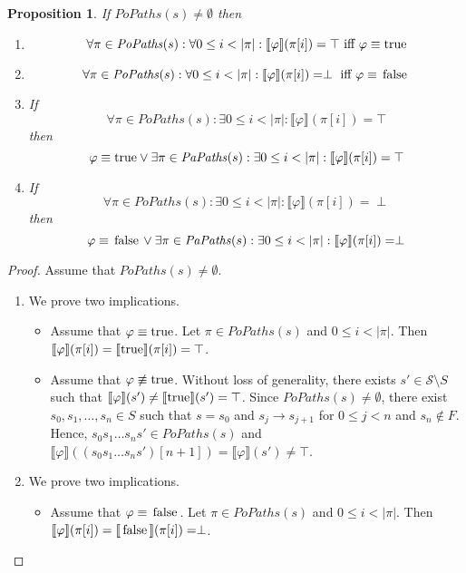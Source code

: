 \documentclass[12pt]{article}
\newcommand{\TRUE}{\mbox{\lstinline{true}}}
\newcommand{\FALSE}{\mbox{\lstinline{false}}}
\newtheorem{proposition}{Proposition}
\theoremstyle{definition}
\newcommand{\satisfaction}[1]{\llbracket #1 \rrbracket}
\newenvironment{franck}{\color{red}}{\color{black}}
\begin{document}
\begin{franck}
\begin{proposition}
If $\mathit{PoPaths}(s) \not= \emptyset$ then
\begin{enumerate}
\item
\[
\forall \pi \in \mathit{PoPaths}(s) : \forall 0 \leq i < |\pi| : \satisfaction{\varphi}(\pi[i]) = \top \mbox{ iff } \varphi \equiv \TRUE
\]
\item
\[
\forall \pi \in \mathit{PoPaths}(s) : \forall 0 \leq i < |\pi| : \satisfaction{\varphi}(\pi[i]) = \perp \mbox{ iff } \varphi \equiv \FALSE
\]
\item
If 
\[
\forall \pi \in \mathit{PoPaths}(s) : \exists 0 \leq i < |\pi| : \satisfaction{\varphi}(\pi[i]) = \top
\]
then
\[
\varphi \equiv \TRUE \vee \exists \pi \in \mathit{PaPaths}(s) : \exists 0 \leq i < |\pi| : \satisfaction{\varphi}(\pi[i]) = \top
\]
\item
If 
\[
\forall \pi \in \mathit{PoPaths}(s) : \exists 0 \leq i < |\pi| : \satisfaction{\varphi}(\pi[i]) = \perp
\]
then
\[
\varphi \equiv \FALSE \vee \exists \pi \in \mathit{PaPaths}(s) : \exists 0 \leq i < |\pi| : \satisfaction{\varphi}(\pi[i]) = \perp
\]
\end{enumerate}
\end{proposition}
\begin{proof}
Assume that $\mathit{PoPaths}(s) \not= \emptyset$.  
\begin{enumerate}
\item
We prove two implications.
\begin{itemize}
\item 
Assume that $\varphi \equiv \TRUE$.  Let $\pi \in \mathit{PoPaths}(s)$ and $0 \leq i < |\pi|$.  Then $\satisfaction{\varphi}(\pi[i]) = \satisfaction{\TRUE}(\pi[i]) = \top$.
\item
Assume that $\varphi \not\equiv \TRUE$.  Without loss of generality, there exists $s' \in \mathcal{S} \setminus S$ such that $\satisfaction{\varphi}(s') \not= \satisfaction{\TRUE}(s') = \top$.  Since $\mathit{PoPaths}(s) \not= \emptyset$, there exist $s_0, s_1, \ldots, s_n \in S$ such that $s = s_0$ and $s_j \rightarrow s_{j+1}$ for $0 \leq j < n$ and $s_n \not\in F$.  Hence, $s_0 s_1 \ldots s_n s' \in \mathit{PoPaths}(s)$ and $\satisfaction{\varphi}((s_0 s_1 \ldots s_n s')[n+1]) = \satisfaction{\varphi}(s') \not= \top$.
\end{itemize}
\item
We prove two implications.
\begin{itemize}
\item 
Assume that $\varphi \equiv \FALSE$.  Let $\pi \in \mathit{PoPaths}(s)$ and $0 \leq i < |\pi|$.  Then $\satisfaction{\varphi}(\pi[i]) = \satisfaction{\FALSE}(\pi[i]) = \perp$.

\end{itemize}
\end{enumerate}
\end{proof}
\end{franck}
\end{document}
